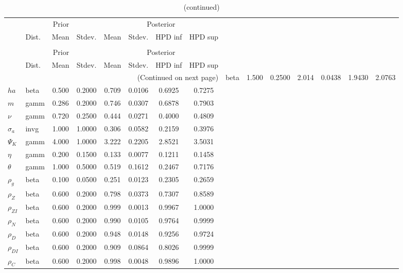  
\begin{center}
\begin{longtable}{llcccccc} 
\caption{Results from Metropolis-Hastings (parameters)}
 \label{Table:MHPosterior:1}\\
\toprule 
  & \multicolumn{3}{c}{Prior}  &  \multicolumn{4}{c}{Posterior} \\
  \cmidrule(r{.75em}){2-4} \cmidrule(r{.75em}){5-8}
  & Dist. & Mean  & Stdev. & Mean & Stdev. & HPD inf & HPD sup\\
\midrule \endfirsthead 
\caption{(continued)}\\\toprule 
  & \multicolumn{3}{c}{Prior}  &  \multicolumn{4}{c}{Posterior} \\
  \cmidrule(r{.75em}){2-4} \cmidrule(r{.75em}){5-8}
  & Dist. & Mean  & Stdev. & Mean & Stdev. & HPD inf & HPD sup\\
\midrule \endhead 
\bottomrule \multicolumn{8}{r}{(Continued on next page)} \endfoot 
\bottomrule \endlastfoot 
${\gamma}$ & beta &   1.500 & 0.2500 &   2.014& 0.0438 &  1.9430 &  2.0763 \\ 
${ha}$ & beta &   0.500 & 0.2000 &   0.709& 0.0106 &  0.6925 &  0.7275 \\ 
${m}$ & gamm &   0.286 & 0.2000 &   0.746& 0.0307 &  0.6878 &  0.7903 \\ 
$\nu$ & gamm &   0.720 & 0.2500 &   0.444& 0.0271 &  0.4000 &  0.4809 \\ 
${\sigma_a}$ & invg &   1.000 & 1.0000 &   0.306& 0.0582 &  0.2159 &  0.3976 \\ 
${\Psi_K}$ & gamm &   4.000 & 1.0000 &   3.222& 0.2205 &  2.8521 &  3.5031 \\ 
${\eta}$ & gamm &   0.200 & 0.1500 &   0.133& 0.0077 &  0.1211 &  0.1458 \\ 
${\theta}$ & gamm &   1.000 & 0.5000 &   0.519& 0.1612 &  0.2467 &  0.7176 \\ 
${\rho_g}$ & beta &   0.100 & 0.0500 &   0.251& 0.0123 &  0.2305 &  0.2659 \\ 
${\rho_Z}$ & beta &   0.600 & 0.2000 &   0.798& 0.0373 &  0.7307 &  0.8589 \\ 
${\rho_{ZI}}$ & beta &   0.600 & 0.2000 &   0.999& 0.0013 &  0.9967 &  1.0000 \\ 
${\rho_N}$ & beta &   0.600 & 0.2000 &   0.990& 0.0105 &  0.9764 &  0.9999 \\ 
${\rho_D}$ & beta &   0.600 & 0.2000 &   0.948& 0.0148 &  0.9256 &  0.9724 \\ 
${\rho_{DI}}$ & beta &   0.600 & 0.2000 &   0.909& 0.0864 &  0.8026 &  0.9999 \\ 
${\rho_C}$ & beta &   0.600 & 0.2000 &   0.998& 0.0048 &  0.9896 &  1.0000 \\ 
\end{longtable}
 \end{center}
